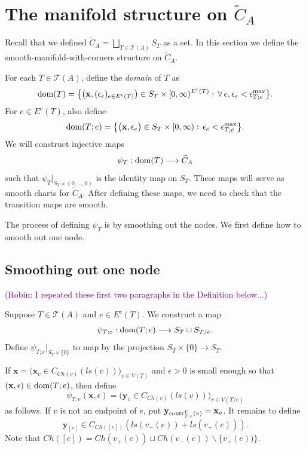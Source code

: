 \documentclass[11pt]{article}
\theoremstyle{definition}
\theoremstyle{remark}
\def\wt#1{\widetilde{#1}}
\def\cT{\mathcal{T}}
\def\dom{{\tn{dom}}}
\def\Ch{{{Ch}}}
\def\bx{\mathbf{x}}
\def\by{\mathbf{y}}
\def\cmt#1{\textcolor{purple}{(#1)}}
\def\tn#1{\textnormal{#1}}
\def\x{\!\times\!}
\begin{document}
\section{The manifold structure on \texorpdfstring{$\wt{C}_A$}{the big configuration space}}
\label{conftilde_sec}

Recall that we defined $\wt{C}_A=\bigsqcup_{T\in\cT(A)}S_T$ as a set. 
In this section we define the smooth-manifold-with-corners structure on $\wt{C}_A$. 


For each $T\in\cT(A)$, define 
the {\em domain} of $T$ as 
$$\dom(T)=\big\{\big(\bx,(\epsilon_e)_{e\in E^c(T)}\big)\in S_T\times[0,\infty)^{E^c(T)}:\,\forall\,e, \epsilon_e<\epsilon^{\max}_{T;e}\big\}.$$
For $e\in E^c(T)$, also define
$$\dom(T;e)=\big\{\big(\bx,\epsilon_e\big)\in S_T\times[0,\infty):\, \epsilon_e<\epsilon^{\max}_{T;e}\big\}.$$
We will construct injective maps 
$$\psi_T:\dom(T)\longrightarrow \widetilde{C}_A$$
such that $\psi_T|_{S_T\times(0,\ldots,0)}$ is the identity map on $S_T$. 
These maps will serve as smooth charts for $\widetilde{C}_A$.
After defining these maps, we need to check that the transition maps are smooth.  


The process of defining $\psi_T$ is by smoothing out the nodes. We first define how to smooth out one node. 

\subsection{Smoothing out one node}

\cmt{Robin: I repeated these first two paragraphs in the Definition below...}

Suppose $T\in\cT(A)$ and $e\in E^c(T)$. 
We construct a map 
$$\psi_{T;e}: \dom(T;e)\longrightarrow S_T\sqcup S_{T/e}.$$
Define $\psi_{T;e}|_{S_T\times \{0\}}$ to map by the projection $S_T \x \{0\} \to S_T$. 

If $\bx=\big(\bx_v\in C_{\Ch(v)}(ls(v))\big)_{v\in V(T)}$ and $\epsilon>0$ is small enough so that 
$(\bx,\epsilon) \in \dom(T;e)$, then define 
\[
\psi_{T;e}(\bx,\epsilon)=\big(\by_v\in C_{\Ch(v)}(ls(v))\big)_{v\in V(T/e)}
\]
as follows.
If $v$ is not an endpoint of $e$, put $\by_{\tn{contr}^V_{T;e}(v)}=\bx_v$.  It remains to define 
\[
\by_{[e]}\in C_{\Ch([e])}(ls(v_-(e))+ls(v_+(e))).
\]
Note that $\Ch([e])=\Ch(v_+(e))\sqcup \Ch(v_-(e)) \backslash \{v_+(e))\}$.
\end{document}
